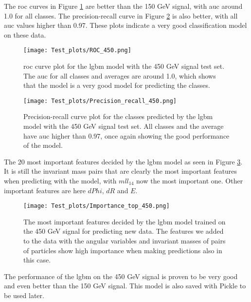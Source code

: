 \documentclass[a4paper, american, 12pt]{report}
\begin{document}
	The \acrshort{roc} curves in Figure \ref{fig:ROCTest_450} are better than the 150 GeV signal, with \acrshort{auc} around 1.0 for all classes. The precision-recall curve in Figure \ref{fig:PrecisionRecallTest_450} is also better, with all \acrshort{auc} values higher than 0.97. These plots indicate a very good classification model on these data.
	\begin{figure}[h!tb!]
		\centering\texttt{[image: Test\_plots/ROC\_450.png]}
		\caption[Test set \acrshort{roc} plot for the \acrshort{lgbm} model trained on the 450 GeV signal.]{\acrshort{roc} curve plot for the \acrshort{lgbm} model with the 450 GeV signal test set. The \acrshort{auc} for all classes and averages are around 1.0, which shows that the model is a very good model for predicting the classes. \label{fig:ROCTest_450}}
	\end{figure}
	\begin{figure}[h!tb]
		\centering\texttt{[image: Test\_plots/Precision\_recall\_450.png]}
		\caption[Test set precision-recall plot for the \acrshort{lgbm} model trained on the 450 GeV signal.]{Precision-recall curve plot for the classes predicted by the \acrshort{lgbm} model with the 450 GeV signal test set. All classes and the average have \acrshort{auc} higher than 0.97, once again showing the good performance of the model. \label{fig:PrecisionRecallTest_450}}
	\end{figure}
	
	The 20 most important features decided by the \acrshort{lgbm} model as seen in Figure \ref{fig:ImpTop_450}. It is still the invariant mass pairs that are clearly the most important features when predicting with the model, with $mll_{14}$ now the most important one. Other important features are here $dPhi$, $dR$ and $E$.
	\begin{figure}[htb!]
		\centering\texttt{[image: Test\_plots/Importance\_top\_450.png]}
		\caption[Test set most important features of the \acrshort{lgbm} model trained on the 450 GeV signal.]{The most important features decided by the \acrshort{lgbm} model trained on the 450 GeV signal for predicting new data. The features we added to the data with the angular variables and invariant masses of pairs of particles show high importance when making predictions also in this case. \label{fig:ImpTop_450}}
	\end{figure}
	
	The performance of the \acrshort{lgbm} on the 450 GeV signal is proven to be very good and even better than the 150 GeV signal. This model is also saved with Pickle to be used later.
\end{document}

